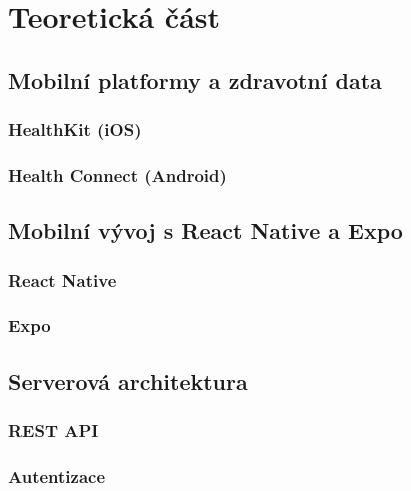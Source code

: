 \chapter{Teoretická část}

\section{Mobilní platformy a zdravotní data}

\subsection{HealthKit (iOS)}

\subsection{Health Connect (Android)}

\section{Mobilní vývoj s React Native a Expo}

\subsection{React Native}

\subsection{Expo}

\section{Serverová architektura}

\subsection{REST API}

\subsection{Autentizace}